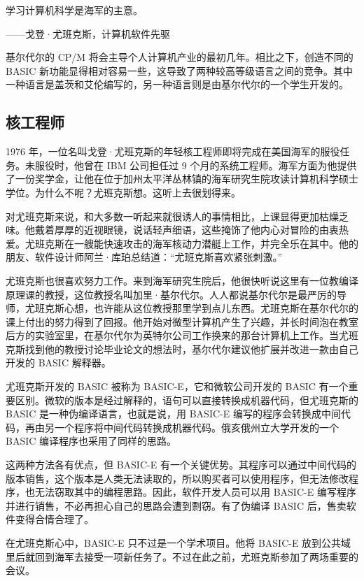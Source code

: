 \documentclass[12pt,UTF8]{ctexbook}
\begin{document}
学习计算机科学是海军的主意。

——戈登·尤班克斯，计算机软件先驱



基尔代尔的 CP/M 将会主导个人计算机产业的最初几年。相比之下，创造不同的 BASIC 新功能显得相对容易一些，这导致了两种较高等级语言之间的竞争。其中一种语言是盖茨和艾伦编写的，另一种语言则是由基尔代尔的一个学生开发的。





\subsection{核工程师}


1976 年，一位名叫戈登·尤班克斯的年轻核工程师即将完成在美国海军的服役任务。未服役时，他曾在 IBM 公司担任过 9 个月的系统工程师。海军方面为他提供了一份奖学金，让他在位于加州太平洋丛林镇的海军研究生院攻读计算机科学硕士学位。为什么不呢？尤班克斯想。这听上去很划得来。

对尤班克斯来说，和大多数一听起来就很诱人的事情相比，上课显得更加枯燥乏味。他戴着厚厚的近视眼镜，说话轻声细语，这些掩饰了他内心对冒险的由衷热爱。尤班克斯在一艘能快速攻击的海军核动力潜艇上工作，并完全乐在其中。他的朋友、软件设计师阿兰·库珀总结道：“尤班克斯喜欢紧张刺激。”

尤班克斯也很喜欢努力工作。来到海军研究生院后，他很快听说这里有一位教编译原理课的教授，这位教授名叫加里·基尔代尔。人人都说基尔代尔是最严厉的导师，尤班克斯心想，也许能从这位教授那里学到点儿东西。尤班克斯在基尔代尔的课上付出的努力得到了回报。他开始对微型计算机产生了兴趣，并长时间泡在教室后方的实验室里，在基尔代尔为英特尔公司工作换来的那台计算机上工作。当尤班克斯找到他的教授讨论毕业论文的想法时，基尔代尔建议他扩展并改进一款由自己开发的 BASIC 解释器。

尤班克斯开发的 BASIC 被称为 BASIC-E，它和微软公司开发的 BASIC 有一个重要区别。微软的版本是经过解释的，语句可以直接转换成机器代码，但尤班克斯的 BASIC 是一种伪编译语言，也就是说，用 BASIC-E 编写的程序会转换成中间代码，再由另一个程序将中间代码转换成机器代码。俄亥俄州立大学开发的一个 BASIC 编译程序也采用了同样的思路。

这两种方法各有优点，但 BASIC-E 有一个关键优势。其程序可以通过中间代码的版本销售，这个版本是人类无法读取的，所以购买者可以使用程序，但无法修改程序，也无法窃取其中的编程思路。因此，软件开发人员可以用 BASIC-E 编写程序并进行销售，不必再担心自己的思路会遭到剽窃。有了伪编译 BASIC 后，售卖软件变得合情合理了。

在尤班克斯心中，BASIC-E 只不过是一个学术项目。他将 BASIC-E 放到公共域里后就回到海军去接受一项新任务了。不过在此之前，尤班克斯参加了两场重要的会议。
\end{document}
